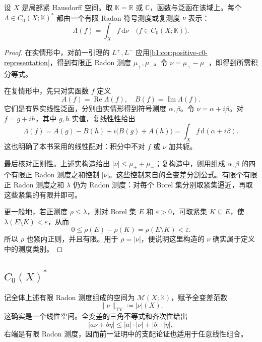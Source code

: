 \begin{proposition}\label{b1:prop:bounded-c0-measure-existence}
设 \(X\) 是局部紧 Hausdorff 空间。取 \(\mathbb K=\mathbb R\) 或 \(\mathbb C\)，函数与泛函在该域上。每个 \(\Lambda\in C_0(X;\mathbb K)^*\) 都由一个有限 Radon 符号测度或复测度 \(\nu\) 表示：
\[
 \Lambda(f)=\int_X f\,\mathrm d\nu
 \quad\bigl(f\in C_0(X;\mathbb K)\bigr).
\]
\end{proposition}
\begin{proof}
在实情形中，对前一引理的 \(L^+,L^-\) 应用\cref{b1:cor:positive-c0-representation}，得到有限正 Radon 测度 \(\mu_+,\mu_-\)。令 \(\nu=\mu_+-\mu_-\)，即得到所需积分等式。

在复情形中，先只对实函数 \(f\) 定义
\[
 A(f)=\operatorname{Re}\Lambda(f),\quad
 B(f)=\operatorname{Im}\Lambda(f).
\]
它们是有界实线性泛函，分别由实情形得到符号测度 \(\alpha,\beta\)。令 \(\nu=\alpha+i\beta\)。对 \(f=g+ih\)，其中 \(g,h\) 实值，复线性性给出
\[
 \Lambda(f)=A(g)-B(h)+i\bigl(B(g)+A(h)\bigr)
 =\int_X f\,\mathrm d(\alpha+i\beta).
\]
这也明确了本书采用的线性配对：积分中不对 \(f\) 或 \(\nu\) 加共轭。

最后核对正则性。上述实构造给出 \(|\nu|\leq\mu_++\mu_-\)；复构造中，则用组成 \(\alpha,\beta\) 的四个有限正 Radon 测度之和控制 \(|\nu|\)。这些控制来自的全变差分割公式。有限个有限正 Radon 测度之和 \(\lambda\) 仍为 Radon 测度：对每个 Borel 集分别取紧集逼近，再取这些紧集的有限并即可。

更一般地，若正测度 \(\rho\leq\lambda\)，则对 Borel 集 \(E\) 和 \(\varepsilon>0\)，可取紧集 \(K\subseteq E\)，使 \(\lambda(E\setminus K)<\varepsilon\)，从而
\[
 0\leq\rho(E)-\rho(K)=\rho(E\setminus K)<\varepsilon.
\]
所以 \(\rho\) 也紧内正则，并且有限。用于 \(\rho=|\nu|\)，便说明这里构造的 \(\nu\) 确实属于定义中的测度类别。
\end{proof}

\subsection{\texorpdfstring{\(C_0(X)^*\)}{C0(X)*}}
\label{b1:subsec:110403}

记全体上述有限 Radon 测度组成的空间为 \(\mathcal M(X;\mathbb K)\)，赋予全变差范数
\[
 \|\nu\|_{\mathrm{TV}}\coloneqq|\nu|(X).
\]
这确实是一个线性空间。全变差的三角不等式和齐次性给出
\[
 |a\nu+b\eta|\leq|a|\cdot|\nu|+|b|\cdot|\eta|,
\]
右端是有限 Radon 测度，因而前一证明中的支配论证也适用于任意线性组合。

